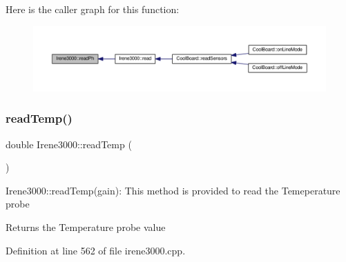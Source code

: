 Here is the caller graph for this function\+:\nopagebreak
\begin{figure}[H]
\begin{center}
\leavevmode
\includegraphics[width=350pt]{d6/d03/class_irene3000_a436fc0a06681cd0784aba56b9707f19a_icgraph}
\end{center}
\end{figure}
\mbox{\label{class_irene3000_a80bc6dfea106dc3bc54fa20204d4d5dc}} 
\subsubsection{\texorpdfstring{read\+Temp()}{readTemp()}}
{\footnotesize\ttfamily double Irene3000\+::read\+Temp (\begin{DoxyParamCaption}{ }\end{DoxyParamCaption})}

Irene3000\+::read\+Temp(gain)\+: This method is provided to read the Temeperature probe

\begin{DoxyReturn}{Returns}
the Temperature probe value 
\end{DoxyReturn}


Definition at line 562 of file irene3000.\+cpp.



